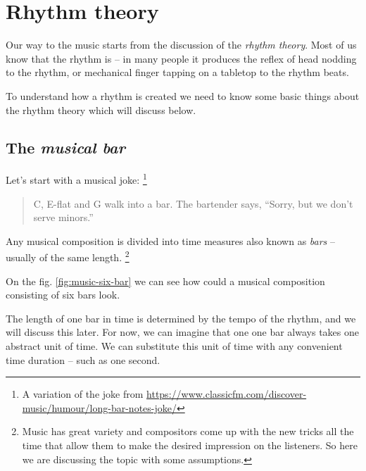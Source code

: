 \documentclass[../sparc.tex]{subfiles}
\begin{document}
\newpage
\section{Rhythm theory}

Our way to the music starts from the discussion of the \emph{rhythm theory}.
Most of us know that the rhythm is -- in many people it produces the reflex of
head nodding to the rhythm, or mechanical finger tapping on a tabletop to the
rhythm beats.

To understand how a rhythm is created we need to know some basic things about
the rhythm theory which will discuss below.

\subsection{The \emph{musical bar}}

Let's start with a musical joke: \footnote{A variation of the joke from
\url{https://www.classicfm.com/discover-music/humour/long-bar-notes-joke/}}

\begin{quotation}
C, E-flat and G walk into a bar.  The bartender says, ``Sorry, but we don’t
serve minors.''
\end{quotation}

Any musical composition is divided into time measures also known as \emph{bars}
-- usually of the same length. \footnote{Music has great variety and compositors
come up with the new tricks all the time that allow them to make the desired
impression on the listeners.  So here we are discussing the topic with some
assumptions.}

On the fig. \ref{fig:music-six-bar} we can see how could a musical composition
consisting of six bars look.


The length of one bar in time is determined by the tempo of the rhythm, and we
will discuss this later.  For now, we can imagine that one one bar always takes
one abstract unit of time.  We can substitute this unit of time with any
convenient time duration -- such as one second.
\end{document}
